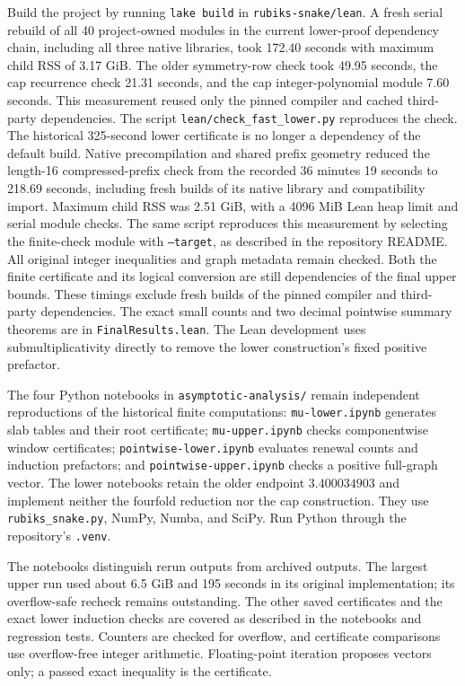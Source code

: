 \documentclass[conference]{IEEEtran}
\begin{document}
Build the project by running \texttt{lake build} in
\texttt{rubiks-snake/lean}. A fresh serial rebuild of all 40 project-owned
modules in the current lower-proof dependency chain, including all three
native libraries, took 172.40 seconds with maximum child RSS of 3.17 GiB.
The older symmetry-row check took 49.95 seconds, the cap recurrence check
21.31 seconds, and the cap integer-polynomial module 7.60 seconds.
This measurement
reused only the pinned compiler and cached third-party dependencies.
The script \texttt{lean/check\_fast\_lower.py} reproduces the check.
The historical 325-second lower certificate is no longer a dependency
of the default build.
Native precompilation and shared prefix geometry reduced the length-16
compressed-prefix check from the recorded 36 minutes 19 seconds to
218.69 seconds, including fresh builds of its native library and
compatibility import. Maximum child RSS was 2.51 GiB, with a
4096 MiB Lean heap limit and serial module checks. The same script
reproduces this measurement by selecting the finite-check module with
\texttt{--target}, as described in the repository README.
All original integer inequalities and graph metadata remain checked.
Both the finite certificate and its logical conversion are still
dependencies of the final upper bounds. These timings exclude fresh
builds of the pinned compiler and third-party dependencies.
The exact small counts and two decimal pointwise summary theorems are in
\texttt{FinalResults.lean}. The Lean development uses submultiplicativity
directly to remove the lower construction's fixed positive prefactor.

The four Python notebooks in \texttt{asymptotic-analysis/} remain
independent reproductions of the historical finite computations:
\texttt{mu-lower.ipynb} generates slab tables and their root certificate;
\texttt{mu-upper.ipynb} checks componentwise window certificates;
\texttt{pointwise-lower.ipynb} evaluates renewal counts and induction
prefactors; and \texttt{pointwise-upper.ipynb} checks a positive
full-graph vector. The lower notebooks retain the older endpoint
$3.400034903$ and implement neither the fourfold reduction nor the cap construction.
They use \texttt{rubiks\_snake.py}, NumPy,
Numba, and SciPy. Run Python through the repository's \texttt{.venv}.

The notebooks distinguish rerun outputs from archived outputs.
The largest upper run used about 6.5 GiB and 195 seconds in its
original implementation; its overflow-safe recheck remains outstanding.
The other saved certificates and the exact lower induction checks
are covered as described in the notebooks and regression tests.
Counters are checked for overflow, and certificate comparisons use
overflow-free integer arithmetic. Floating-point iteration proposes
vectors only; a passed exact inequality is the certificate.
\end{document}
